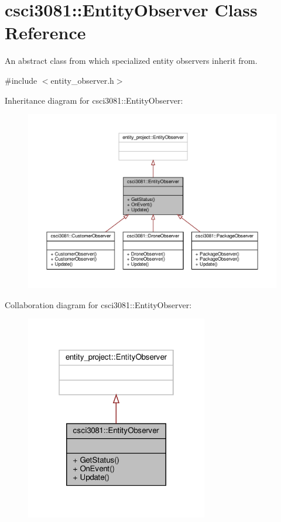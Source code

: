 \hypertarget{classcsci3081_1_1EntityObserver}{}\section{csci3081\+:\+:Entity\+Observer Class Reference}
\label{classcsci3081_1_1EntityObserver}


An abstract class from which specialized entity observers inherit from.  




{\ttfamily \#include $<$entity\+\_\+observer.\+h$>$}



Inheritance diagram for csci3081\+:\+:Entity\+Observer\+:
\nopagebreak
\begin{figure}[H]
\begin{center}
\leavevmode
\includegraphics[width=350pt]{classcsci3081_1_1EntityObserver__inherit__graph}
\end{center}
\end{figure}


Collaboration diagram for csci3081\+:\+:Entity\+Observer\+:\nopagebreak
\begin{figure}[H]
\begin{center}
\leavevmode
\includegraphics[width=226pt]{classcsci3081_1_1EntityObserver__coll__graph}
\end{center}
\end{figure}
